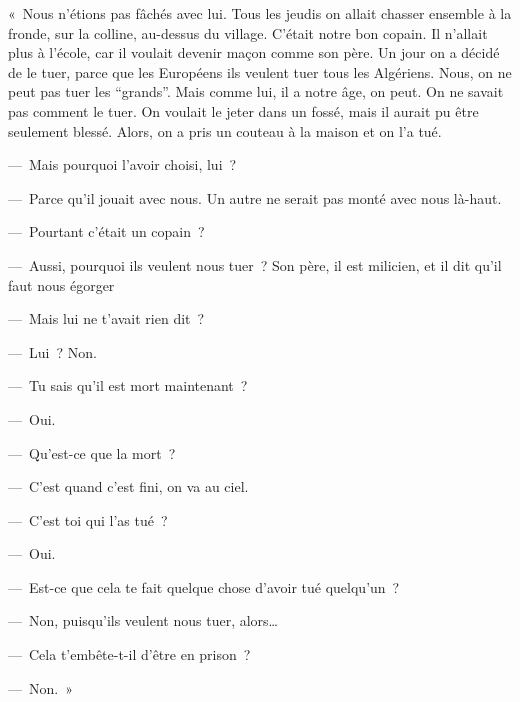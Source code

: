 \documentclass[french,twoside]{book} %
\def\mednobreak{\ifdim\lastskip<\medskipamount
  \removelastskip\nopagebreak\medskip\fi}
\newcommand{\labelblock}[1]{\medbreak{\noindent\color{rubric}\bfseries #1}\par\mednobreak}
\begin{document}
\noindent « Nous n’étions pas fâchés avec lui. Tous les jeudis on allait chasser ensemble à la fronde, sur la colline, au-dessus du village. C’était notre bon copain. Il n’allait plus à l’école, car il voulait devenir maçon comme son père. Un jour on a décidé de le tuer, parce que les Européens ils veulent tuer tous les Algériens. Nous, on ne peut pas tuer les “grands”. Mais comme lui, il a notre âge, on peut. On ne savait pas comment le tuer. On voulait le jeter dans un fossé, mais il aurait pu être seulement blessé. Alors, on a pris un couteau à la maison et on l’a tué.\par
 — Mais pourquoi l’avoir choisi, lui ?\par
— Parce qu’il jouait avec nous. Un autre ne serait pas monté avec nous là-haut.\par
— Pourtant c’était un copain ?\par
— Aussi, pourquoi ils veulent nous tuer ? Son père, il est milicien, et il dit qu’il faut nous égorger\par
— Mais lui ne t’avait rien dit ?\par
— Lui ? Non.\par
— Tu sais qu’il est mort maintenant ?\par
— Oui.\par
— Qu’est-ce que la mort ?\par
— C’est quand c’est fini, on va au ciel.\par
— C’est toi qui l’as tué ?\par
— Oui.\par
— Est-ce que cela te fait quelque chose d’avoir tué quelqu’un ?\par
— Non, puisqu’ils veulent nous tuer, alors…\par
— Cela t’embête-t-il d’être en prison ?\par
— Non. »\par

\labelblock{b) Celui de 14 ans.}
\end{document}
